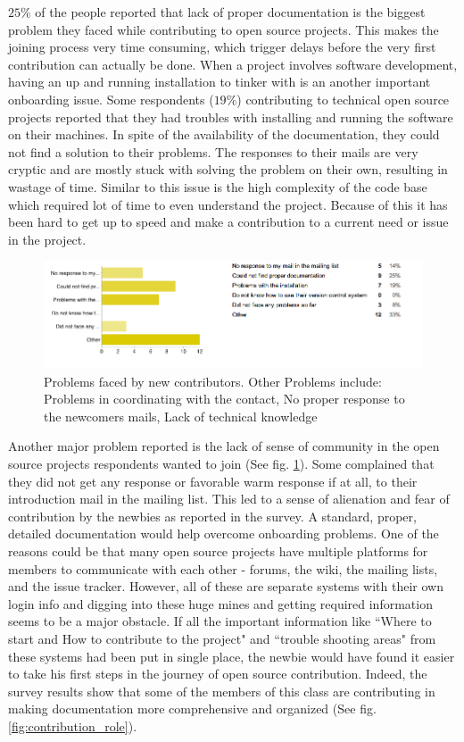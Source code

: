 $25\%$ of the people reported that lack of proper documentation is the biggest problem they faced while contributing to open source projects. This makes the joining process very time consuming, which trigger delays before the very first contribution can actually be done. When a project involves software development,  having an up and running installation to tinker with is an another important onboarding issue. Some respondents ($19\%$) contributing to technical open source projects reported that they had troubles with installing and running the software on their machines. In spite of the availability of the documentation, they could not find a solution to their problems. The responses to their mails are very cryptic and are mostly stuck with solving the problem on their own, resulting in wastage of time. Similar to this issue is the high complexity of the code base which required lot of time to even understand the project. Because of this it has been hard to get up to speed and make a contribution to a current need or issue in the project.

\begin{figure}[ht!]
\centering
\includegraphics[width=130mm]{chapters/img/problems_faced.png}
\caption{Problems faced by new contributors. Other Problems include: Problems in coordinating with the contact, No proper response to the newcomers mails, Lack of technical knowledge}
\label{fig:problem_faced}
\end{figure}


Another major problem reported is the lack of sense of community in the open source projects respondents wanted to join (See fig. \ref{fig:problem_faced}). Some complained that they did not get any response or favorable warm response if at all, to their introduction mail in the mailing list. This led to a sense of alienation and fear of contribution by the newbies as reported in the survey. A standard, proper, detailed documentation  would help overcome onboarding problems. One of the reasons could be  that many open source projects have multiple platforms for members to communicate with each other - forums, the wiki, the mailing lists, and the issue tracker. However, all of these are separate systems with their own login info and digging into these huge mines and getting required information seems to be a major obstacle. If all the important information like ``Where to start and How to contribute to the project" and ``trouble shooting areas" from these systems had been put in single place, the newbie would have found it easier to take his first steps in the journey of open source contribution. Indeed, the survey results show that some of the members of this class are contributing in making documentation more comprehensive and organized (See fig. \ref{fig:contribution_role}).


